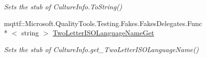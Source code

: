 \begin{DoxyCompactItemize}
\begin{DoxyCompactList}\small\item\em Sets the stub of Culture\-Info.\-To\-String()\end{DoxyCompactList}\item 
mqttf\-::\-Microsoft.\-Quality\-Tools.\-Testing.\-Fakes.\-Fakes\-Delegates.\-Func\\*
$<$ string $>$ \hyperlink{class_system_1_1_globalization_1_1_fakes_1_1_stub_culture_info_aede51a398f7b3fab646986c297cf3e9d}{Two\-Letter\-I\-S\-O\-Language\-Name\-Get}
\begin{DoxyCompactList}\small\item\em Sets the stub of Culture\-Info.\-get\-\_\-\-Two\-Letter\-I\-S\-O\-Language\-Name()\end{DoxyCompactList}\end{DoxyCompactItemize}
